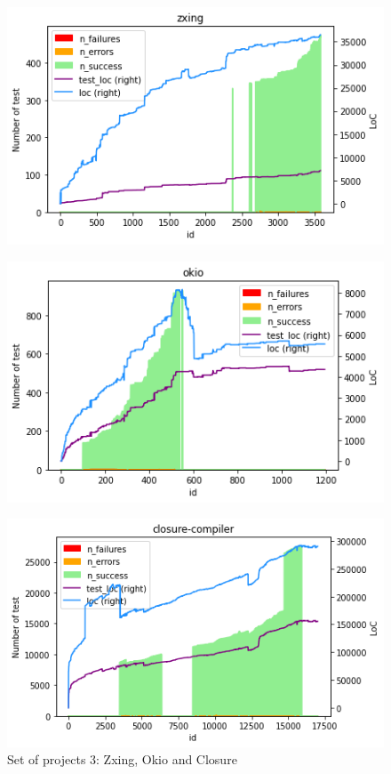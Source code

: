\begin{figure}[!htb]
    \caption{Set of projects 3: Zxing, Okio and Closure}
    \label{fig:projects-3}
    \begin{minipage}{.5\linewidth}
        \centering
        \includegraphics[width=\textwidth]{pages/02-Testability/images/projects/zxing.png}
        \label{fig:zxing}
    \end{minipage}%
    \begin{minipage}{.5\linewidth}
        \centering
        \includegraphics[width=\textwidth]{pages/02-Testability/images/projects/okio.png}
        \label{fig:okio}
    \end{minipage}
    \begin{minipage}{.5\linewidth}
        \centering
        \includegraphics[width=\textwidth]{pages/02-Testability/images/projects/closure.png}

\end{minipage}
\end{figure}
